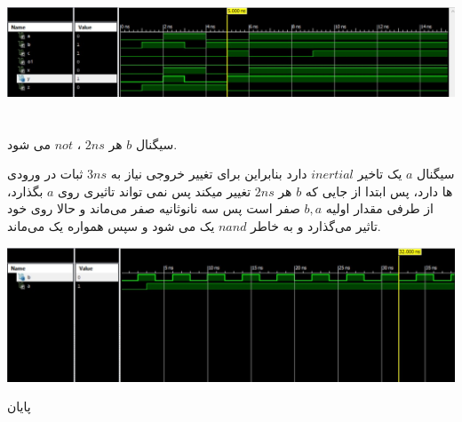 \documentclass[a4paper]{article}
\newcommand{\goodbye}{\begin{center}{\huge
پایان
}\end{center}}
\begin{document}
\begin{center}
\includegraphics[width=15cm]{images/3.jpg}
\end{center}


\section{}
سیگنال $b$ هر $2ns$ ، $not$ می شود.

سیگنال $a$ یک تاخیر $inertial$ دارد بنابراین برای تغییر خروجی نیاز به $3ns$ ثبات در ورودی ها دارد، پس ابتدا از جایی که $b$ هر $2ns$ تغییر میکند پس نمی تواند تاثیری روی $a$ بگذارد، از طرفی مقدار اولیه $b,a$ صفر است پس سه نانوثانیه صفر می‌ماند و حالا روی خود تاثیر می‌گذارد و به خاطر $nand$ یک می شود و سپس همواره یک می‌ماند. 

\begin{center}
\includegraphics[width=15cm]{images/4.jpg}
\end{center}



\newpage
\goodbye
\end{document}
